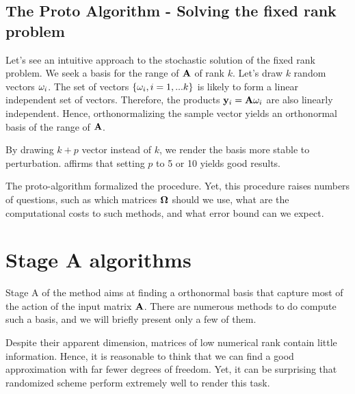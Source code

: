 \documentclass[onecolumn,12pt]{article}
\begin{document}
\subsection{The Proto Algorithm - Solving the fixed rank problem}

Let's see an intuitive approach to the stochastic solution of the fixed rank
problem. We seek a basis for the range of $\bold{A}$ of rank $k$. Let's
draw $k$ random vectors $\bold{\omega}_i$. The set of vectors $\{
\bold{\omega}_i, i=1,...k\}$ is likely to form a linear independent set of
vectors. Therefore, the products $\bold{y}_i = \bold{A} \bold{\omega}_i$ are
also linearly independent. Hence, orthonormalizing the sample vector yields an
orthonormal basis of the range of $\bold{A}$.


\noindent{}

By drawing $k + p$ vector instead of $k$, we render the basis more stable to
perturbation. \cite{structure-randomness} affirms that setting $p$ to 5 or 10
yields good results.

The proto-algorithm formalized the procedure. Yet, this procedure raises
numbers of questions, such as which matrices $\bold{\Omega}$ should we use,
what are the computational costs to such methods, and what error bound can we
expect.

\section{Stage A algorithms}

Stage A of the method aims at finding a orthonormal basis that capture most of
the action of the input matrix $\bold{A}$. There are numerous methods to do
compute such a basis, and we will briefly present only a few of them.

Despite their apparent dimension, matrices of low numerical rank contain
little information. Hence, it is reasonable to think that we can find a good
approximation with far fewer degrees of freedom. Yet, it can be surprising
that randomized scheme perform extremely well to render this task.
\end{document}
